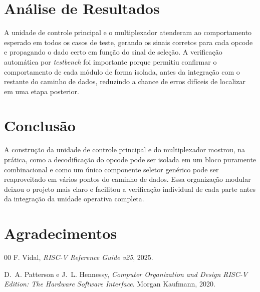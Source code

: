 \documentclass[conference]{IEEEtran}
\begin{document}
\section{Análise de Resultados}
A unidade de controle principal e o multiplexador atenderam ao comportamento esperado em todos os casos de
teste, gerando os sinais corretos para cada opcode e propagando o dado certo em função do sinal de seleção.
A verificação automática por \textit{testbench} foi importante porque permitiu confirmar o comportamento de
cada módulo de forma isolada, antes da integração com o restante do caminho de dados, reduzindo a chance de
erros difíceis de localizar em uma etapa posterior.

\section{Conclusão}
A construção da unidade de controle principal e do multiplexador mostrou, na prática, como a decodificação
do opcode pode ser isolada em um bloco puramente combinacional e como um único componente seletor genérico
pode ser reaproveitado em vários pontos do caminho de dados. Essa organização modular deixou o projeto mais
claro e facilitou a verificação individual de cada parte antes da integração da unidade operativa completa.

\section*{Agradecimentos}



\begin{thebibliography}{00}
F. Vidal,
\textit{RISC-V Reference Guide v25}, 2025.

D.~A. Patterson e J.~L. Hennessy,
\textit{Computer Organization and Design RISC-V Edition: The Hardware Software Interface}.
Morgan Kaufmann, 2020.

\end{thebibliography}
\end{document}
